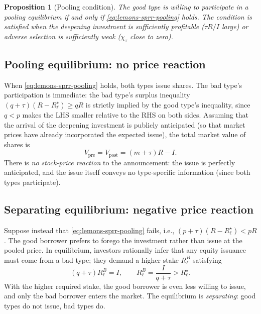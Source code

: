 \documentclass[11pt,a4paper,oneside]{book}
\def\geq{\geqslant}
\theoremstyle{plain}
\newtheorem{proposition}[theorem]{Proposition}
\theoremstyle{definition}
\theoremstyle{remark}
\numberwithin{equation}{chapter}
\begin{document}
\begin{proposition}[Pooling condition]\label{prop:lemons-pooling-condition}
The good type is willing to participate in a pooling equilibrium if and only if \eqref{eq:lemons-sprr-pooling} holds.
The condition is satisfied when the deepening investment is sufficiently profitable ($\tau R/I$ large) or adverse selection is sufficiently weak ($\chi_\tau$ close to zero).
\end{proposition}

\subsection{Pooling equilibrium: no price reaction}

When \eqref{eq:lemons-sprr-pooling} holds, both types issue shares.
The bad type's participation is immediate: the bad type's surplus inequality $(q + \tau)(R - R_\ell^\star) \geq qR$ is strictly implied by the good type's inequality, since $q < p$ makes the LHS smaller relative to the RHS on both sides.
Assuming that the arrival of the deepening investment is publicly anticipated (so that market prices have already incorporated the expected issue), the total market value of shares is
\begin{equation*}
  V_{\text{pre}} = V_{\text{post}} = (m + \tau) R - I.
\end{equation*}
There is \emph{no stock-price reaction} to the announcement: the issue is perfectly anticipated, and the issue itself conveys no type-specific information (since both types participate).

\subsection{Separating equilibrium: negative price reaction}

Suppose instead that \eqref{eq:lemons-sprr-pooling} fails, i.e., $(p + \tau)(R - R_\ell^\star) < pR$.
The good borrower prefers to forego the investment rather than issue at the pooled price.
In equilibrium, investors rationally infer that any equity issuance must come from a bad type; they demand a higher stake $R_\ell^{B}$ satisfying
\begin{equation*}
  (q + \tau) R_\ell^{B} = I,
  \qquad
  R_\ell^{B} = \frac{I}{q + \tau} > R_\ell^\star.
\end{equation*}
With the higher required stake, the good borrower is even less willing to issue, and only the bad borrower enters the market.
The equilibrium is \emph{separating}: good types do not issue, bad types do.
\end{document}
